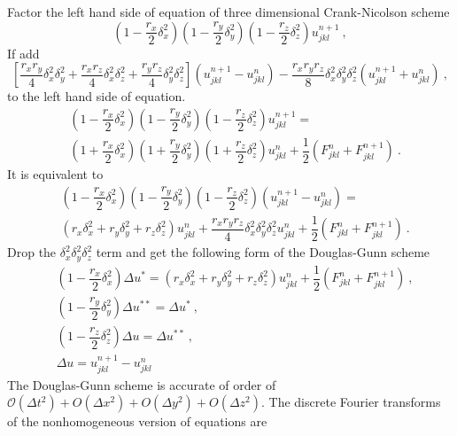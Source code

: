 \documentclass[12pt,a4paper]{article}
\begin{document}
Factor the left hand side of equation of three dimensional Crank-Nicolson scheme
\begin{equation}
\left(1 - \dfrac{r_x}{2} \delta_x^2 \right) \left(1 - \dfrac{r_y}{2} \delta_y^2 \right) \left(1 - \dfrac{r_z}{2} \delta_z^2 \right) u_{jkl}^{n+1} ~,
\end{equation}
If add
\begin{equation}
\left[ \dfrac{r_x r_y}{4} \delta_x^2 \delta_y^2 +\dfrac{r_x r_z}{4} \delta_x^2 \delta_z^2 +\dfrac{r_y r_z}{4} \delta_y^2 \delta_z^2 \right] \left(u_{jkl}^{n+1} -u_{jkl}^{n} \right) -\dfrac{r_x r_y r_z}{8} \delta_x^2 \delta_y^2 \delta_z^2 \left(u_{jkl}^{n+1} +u_{jkl}^{n} \right) ~,
\end{equation}
to the left hand side of equation.
\begin{align}
\nonumber & \left(1 - \dfrac{r_x}{2} \delta_x^2 \right) \left(1 - \dfrac{r_y}{2} \delta_y^2 \right) \left(1 - \dfrac{r_z}{2} \delta_z^2 \right) u_{jkl}^{n+1}  = \\
& \left(1+\dfrac{r_x}{2} \delta_x^2 \right) \left(1+\dfrac{r_y}{2} \delta_y^2 \right) \left(1+\dfrac{r_z}{2} \delta_z^2 \right) u_{jkl}^{n} +\dfrac{1}{2} \left( F_{jkl}^{n} +F_{jkl}^{n+1} \right) ~.
\end{align}
It is equivalent to
\begin{align}
\nonumber &\left(1-\dfrac{r_x}{2} \delta_x^2 \right) \left(1-\dfrac{r_y}{2} \delta_y^2 \right) \left(1-\dfrac{r_z}{2} \delta_z^2 \right) \left(u_{jkl}^{n+1} -u_{jkl}^{n} \right) = \\
& \left(r_x \delta_x^2+r_y \delta_y^2+ r_z\delta_z^2 \right) u_{jkl}^{n} +\dfrac{r_x r_y r_z}{4} \delta_x^2 \delta_y^2 \delta_z^2 u_{jkl}^{n} +\dfrac{1}{2} \left( F_{jkl}^{n} +F_{jkl}^{n+1} \right) ~.
\end{align}
Drop the $ \delta_x^2 \delta_y^2 \delta_z^2$ term and get the following form of the Douglas-Gunn scheme
\begin{align}
& \left(1-\dfrac{r_x}{2} \delta_x^2 \right) \Delta u^\ast = \left(r_x \delta_x^2+r_y \delta_y^2+ r_z\delta_z^2 \right) u_{jkl}^{n} +\dfrac{1}{2} \left( F_{jkl}^{n} +F_{jkl}^{n+1} \right) ~, \\
& \left(1-\dfrac{r_y}{2} \delta_y^2 \right) \Delta u^{\ast\ast} = \Delta u^\ast ~, \\
& \left(1-\dfrac{r_z}{2} \delta_z^2 \right) \Delta u = \Delta u^{\ast\ast} ~, \\
& \Delta u = u_{jkl}^{n+1} -u_{jkl}^{n}
\end{align}
The Douglas-Gunn scheme is accurate of order of $\mathcal O(\Delta t^2) + O(\Delta x^2) + O(\Delta y^2) + O(\Delta z^2)$. The discrete Fourier transforms of the nonhomogeneous version of equations are
\end{document}
